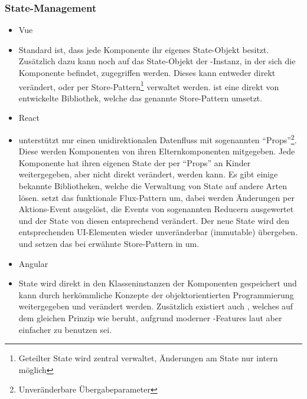 \subsubsection{State-Management}
\begin{itemize}
    \item{Vue}
    \item[] Standard ist, dass jede Komponente ihr eigenes State-Objekt besitzt. Zusätzlich dazu kann noch auf das State-Objekt der -Instanz, in der sich die Komponente befindet, zugegriffen werden. Dieses kann entweder direkt verändert, oder per Store-Pattern\footnote{Geteilter State wird zentral verwaltet, Änderungen am State nur intern möglich} verwaltet werden.  ist eine direkt von  entwickelte Bibliothek, welche das genannte Store-Pattern umsetzt.
    \item{React}
    \item[]  unterstützt nur einen unidirektionalen Datenfluss mit sogenannten ``Props''\footnote{Unveränderbare Übergabeparameter}. Diese werden Komponenten von ihren Elternkomponenten mitgegeben. Jede Komponente hat ihren eigenen State der per ``Props'' an Kinder weitergegeben, aber nicht direkt verändert, werden kann. Es gibt einige bekannte Bibliotheken, welche die Verwaltung von State auf andere Arten lösen.  setzt das funktionale Flux-Pattern um, dabei werden Änderungen per Aktions-Event ausgelöst, die Events von sogenannten Reducern ausgewertet und der State von diesen entsprechend verändert. Der neue State wird den entsprechenden UI-Elementen wieder unveränderbar (immutable) übergeben.  und  setzen das bei  erwähnte Store-Pattern in  um.
    \item{Angular}
    \item[] State wird direkt in den Klasseninstanzen der Komponenten gespeichert und kann durch herkömmliche Konzepte der objektorientierten Programmierung weitergegeben und verändert werden. Zusätzlich existiert auch , welches auf dem gleichen Prinzip wie  beruht, aufgrund moderner -Features laut  aber einfacher zu benutzen sei.
\end{itemize}

